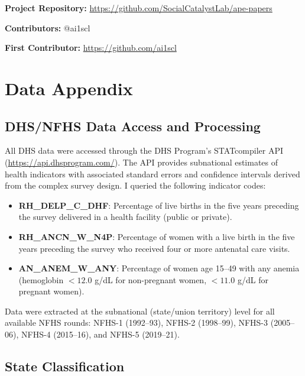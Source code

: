 \documentclass[12pt]{article}
\begin{document}
\noindent\textbf{Project Repository:} \url{https://github.com/SocialCatalystLab/ape-papers}

\noindent\textbf{Contributors:} @ai1scl

\noindent\textbf{First Contributor:} \url{https://github.com/ai1scl}

\label{apep_main_text_end}
\newpage


\newpage
\appendix

\section{Data Appendix}
\label{sec:app_data}

\subsection{DHS/NFHS Data Access and Processing}

All DHS data were accessed through the DHS Program's STATcompiler API (\url{https://api.dhsprogram.com/}). The API provides subnational estimates of health indicators with associated standard errors and confidence intervals derived from the complex survey design. I queried the following indicator codes:

\begin{itemize}
    \item \textbf{RH\_DELP\_C\_DHF}: Percentage of live births in the five years preceding the survey delivered in a health facility (public or private).
    \item \textbf{RH\_ANCN\_W\_N4P}: Percentage of women with a live birth in the five years preceding the survey who received four or more antenatal care visits.
    \item \textbf{AN\_ANEM\_W\_ANY}: Percentage of women age 15--49 with any anemia (hemoglobin $< 12.0$ g/dL for non-pregnant women, $< 11.0$ g/dL for pregnant women).
\end{itemize}

Data were extracted at the subnational (state/union territory) level for all available NFHS rounds: NFHS-1 (1992--93), NFHS-2 (1998--99), NFHS-3 (2005--06), NFHS-4 (2015--16), and NFHS-5 (2019--21).

\subsection{State Classification}
\end{document}
